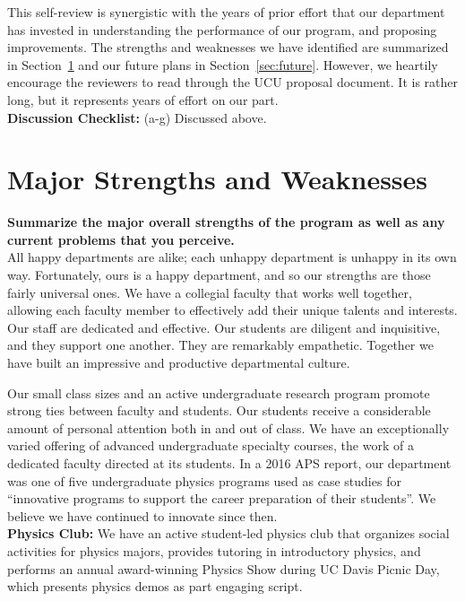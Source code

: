 \documentclass[12pt]{article}
\begin{document}
This self-review is synergistic with the years of prior effort that
our department has invested in understanding the performance of our
program, and proposing improvements.  The strengths and weaknesses we
have identified are summarized in Section~\ref{sec:snws} and our
future plans in Section~\ref{sec:future}.  However, we heartily
encourage the reviewers to read through the UCU proposal document.  It
is rather long, but it represents years of effort on our part.\\[3pt]

\noindent
{\bf Discussion Checklist:} (a-g) Discussed above.

\newpage
\section{Major Strengths and Weaknesses}
\label{sec:snws}

{\bf Summarize the major overall strengths of the program as well as
  any current problems that you perceive.}\\[3pt]

\noindent
All happy departments are alike; each unhappy department is unhappy in
its own way.  Fortunately, ours is a happy department, and so our
strengths are those fairly universal ones.  We have a collegial
faculty that works well together, allowing each faculty member to
effectively add their unique talents and interests.  Our staff are
dedicated and effective.  Our students are diligent and inquisitive,
and they support one another.  They are remarkably empathetic.
Together we have built an impressive and productive departmental
culture.

Our small class sizes and an active undergraduate research program
promote strong ties between faculty and students.  Our students
receive a considerable amount of personal attention both in and out of
class.  We have an exceptionally varied offering of advanced
undergraduate specialty courses, the work of a dedicated faculty
directed at its students.  In a 2016 APS report, our department was one
of five undergraduate physics programs used as case studies for
``innovative programs to support the career preparation of their
students''.  We believe we have continued to innovate since then.\\[3pt]

\noindent
{\bf Physics Club:} We have an active student-led physics club that organizes social activities for physics majors, provides tutoring in introductory physics, and performs an annual award-winning Physics Show during UC Davis Picnic Day, which presents physics demos as part engaging script.\\[3pt]
\end{document}
